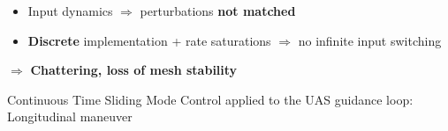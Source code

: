 \documentclass[]{beamer}
\begin{document}
\begin{frame}\frametitle{}
\centering
\begin{tcolorbox}[colback=blue!5!white,colframe=blue!75!black,title=Clash with reality, width=20em,
standard jigsaw,
opacityback=.7]
\begin{itemize}
\item Input dynamics $\Rightarrow$ perturbations \textbf{not matched} 
\item \textbf{Discrete} implementation + rate saturations $\Rightarrow$ no infinite input switching
\end{itemize}
\centering
$\Rightarrow$ \textbf{ Chattering, loss of mesh stability} 
\end{tcolorbox}
\end{frame}

\usebackgroundtemplate{}
\begin{frame}
\Large
\vspace{3em}
\begin{center}
Continuous Time Sliding Mode Control applied to the UAS guidance loop:\\
Longitudinal maneuver
\end{center}
\end{frame}
\end{document}
